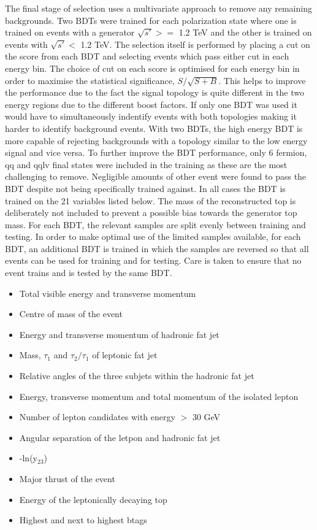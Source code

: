 The final stage of selection uses a multivariate approach to remove any remaining backgrounds. Two \ac{BDT}s were trained for each polarization state where one is trained on events with a generator $\sqrt{s'} >=$ 1.2 TeV and the other is trained on events with  $\sqrt{s'} <$ 1.2 TeV. The selection itself is performed by placing a cut on the score from each \ac{BDT} and selecting events which pass either cut in each energy bin. The choice of cut on each score is optimised for each energy bin in order to maximise the statistical significance, $S/\sqrt{S+B}$. This helps to improve the performance due to the fact the signal topology is quite different in the two energy regions due to the different boost factors. If only one \ac{BDT} was used it would have to simultaneously indentify events with both topologies making it harder to identify background events. With two \ac{BDT}s, the high energy \ac{BDT} is more capable of rejecting backgrounds with a topology similar to the low energy signal and vice versa. To further improve the \ac{BDT} performance, only 6 fermion, qq and qqlv final states were included in the training as these are the most challenging to remove.  Negligible amounts of other event were found to pass the \ac{BDT} despite not being specifically trained against. In all cases the BDT is trained on the 21 variables listed below. The mass of the reconstructed top is deliberately not included to prevent a possible bias towards the generator top mass. For each \ac{BDT}, the relevant samples are split evenly between training and testing. In order to make optimal use of the limited samples available, for each \ac{BDT}, an additional \ac{BDT} is trained in which the samples are reversed so that all events can be used for training and for testing. Care is taken to ensure that no event trains and is tested by the same \ac{BDT}.

\begin{itemize}
\item Total visible energy and transverse momentum
\item Centre of mass of the event
\item Energy and transverse momentum of hadronic fat jet
\item Mass, $\tau_1$ and $\tau_2/\tau_1$ of leptonic fat jet
\item Relative angles of the three subjets within the hadronic fat jet
\item Energy, transverse momentum and total momentum of the isolated lepton
\item Number of lepton candidates with energy $>$ 30 GeV
\item Angular separation of the letpon and hadronic fat jet
\item -ln(y$_{23}$)
\item Major thrust of the event
\item Energy of the leptonically decaying top
\item Highest and next to highest btags
\end{itemize}

